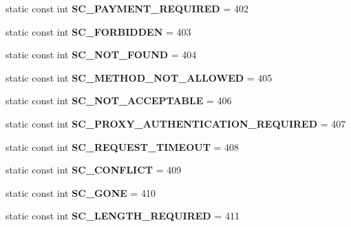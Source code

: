 \begin{DoxyCompactItemize}
static const int {\bfseries S\+C\+\_\+\+P\+A\+Y\+M\+E\+N\+T\+\_\+\+R\+E\+Q\+U\+I\+R\+ED} = 402
\item 
\mbox{\label{class_response_aef26cef9129cfcb52f5e83cff4e78ef4}} 
static const int {\bfseries S\+C\+\_\+\+F\+O\+R\+B\+I\+D\+D\+EN} = 403
\item 
\mbox{\label{class_response_ab1654ef401f18dd3c9b18df62af7a20d}} 
static const int {\bfseries S\+C\+\_\+\+N\+O\+T\+\_\+\+F\+O\+U\+ND} = 404
\item 
\mbox{\label{class_response_a2840d318c42fd9c5ecfa71fefffa9d77}} 
static const int {\bfseries S\+C\+\_\+\+M\+E\+T\+H\+O\+D\+\_\+\+N\+O\+T\+\_\+\+A\+L\+L\+O\+W\+ED} = 405
\item 
\mbox{\label{class_response_a0e22fe2ba22dd82d7d8ebd1a735731c4}} 
static const int {\bfseries S\+C\+\_\+\+N\+O\+T\+\_\+\+A\+C\+C\+E\+P\+T\+A\+B\+LE} = 406
\item 
\mbox{\label{class_response_ae97b4a6f68f2a496b36d187776f3350a}} 
static const int {\bfseries S\+C\+\_\+\+P\+R\+O\+X\+Y\+\_\+\+A\+U\+T\+H\+E\+N\+T\+I\+C\+A\+T\+I\+O\+N\+\_\+\+R\+E\+Q\+U\+I\+R\+ED} = 407
\item 
\mbox{\label{class_response_ab8afae9b5616e3bd972c1bef7961b5ec}} 
static const int {\bfseries S\+C\+\_\+\+R\+E\+Q\+U\+E\+S\+T\+\_\+\+T\+I\+M\+E\+O\+UT} = 408
\item 
\mbox{\label{class_response_ae6249d42d00d41f746afa7416b5238e8}} 
static const int {\bfseries S\+C\+\_\+\+C\+O\+N\+F\+L\+I\+CT} = 409
\item 
\mbox{\label{class_response_aa3b57625ceefa93997c6b230bdd0276e}} 
static const int {\bfseries S\+C\+\_\+\+G\+O\+NE} = 410
\item 
\mbox{\label{class_response_ada22794dd4312e5956e7019dbb5af9c0}} 
static const int {\bfseries S\+C\+\_\+\+L\+E\+N\+G\+T\+H\+\_\+\+R\+E\+Q\+U\+I\+R\+ED} = 411
\item 
\mbox{\label{class_response_a601080c0430770211d41140e83b8ed46}} 

\end{DoxyCompactItemize}
